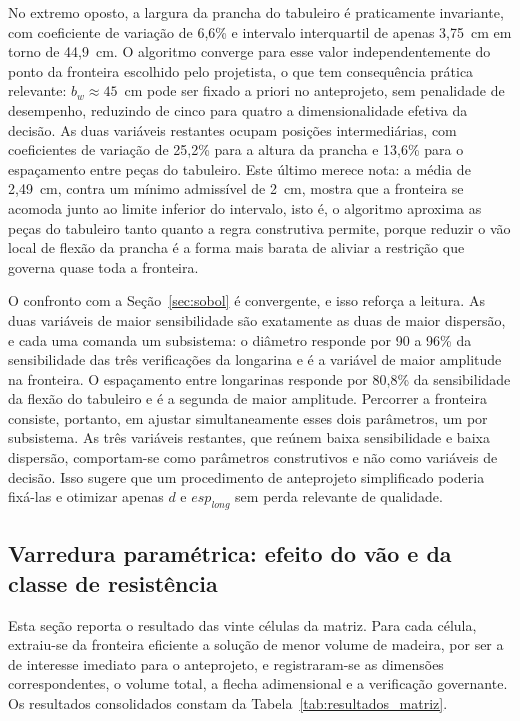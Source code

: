 No extremo oposto, a largura da prancha do tabuleiro é praticamente invariante, com coeficiente de variação de 6{,}6\% e intervalo interquartil de apenas 3{,}75~cm em torno de 44{,}9~cm.
O algoritmo converge para esse valor independentemente do ponto da fronteira escolhido pelo projetista, o que tem consequência prática relevante: $b_w \approx 45$~cm pode ser fixado a priori no anteprojeto, sem penalidade de desempenho, reduzindo de cinco para quatro a dimensionalidade efetiva da decisão.
As duas variáveis restantes ocupam posições intermediárias, com coeficientes de variação de 25{,}2\% para a altura da prancha e 13{,}6\% para o espaçamento entre peças do tabuleiro.
Este último merece nota: a média de 2{,}49~cm, contra um mínimo admissível de 2~cm, mostra que a fronteira se acomoda junto ao limite inferior do intervalo, isto é, o algoritmo aproxima as peças do tabuleiro tanto quanto a regra construtiva permite, porque reduzir o vão local de flexão da prancha é a forma mais barata de aliviar a restrição que governa quase toda a fronteira.

O confronto com a Seção~\ref{sec:sobol} é convergente, e isso reforça a leitura.
As duas variáveis de maior sensibilidade são exatamente as duas de maior dispersão, e cada uma comanda um subsistema: o diâmetro responde por 90 a 96\% da sensibilidade das três verificações da longarina e é a variável de maior amplitude na fronteira. O espaçamento entre longarinas responde por 80{,}8\% da sensibilidade da flexão do tabuleiro e é a segunda de maior amplitude.
Percorrer a fronteira consiste, portanto, em ajustar simultaneamente esses dois parâmetros, um por subsistema.
As três variáveis restantes, que reúnem baixa sensibilidade e baixa dispersão, comportam-se como parâmetros construtivos e não como variáveis de decisão. Isso sugere que um procedimento de anteprojeto simplificado poderia fixá-las e otimizar apenas $d$ e $esp_{long}$ sem perda relevante de qualidade.

\subsection{Varredura paramétrica: efeito do vão e da classe de resistência}\label{sec:varredura}

Esta seção reporta o resultado das vinte células da matriz.
Para cada célula, extraiu-se da fronteira eficiente a solução de menor volume de madeira, por ser a de interesse imediato para o anteprojeto, e registraram-se as dimensões correspondentes, o volume total, a flecha adimensional e a verificação governante.
Os resultados consolidados constam da Tabela~\ref{tab:resultados_matriz}.

